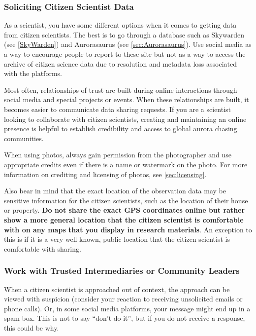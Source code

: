 \documentclass{article}
\newcommand{\contributed}[1]{%
    \par\noindent
    \begingroup
    \setlength{\leftskip}{1em}%
    \itshape
    Contributors: #1
    \par
    \endgroup
    \vspace{0.5em}
}
\begin{document}
\subsubsection{Soliciting Citizen Scientist Data}

As a scientist, you have some different options when it comes to getting data from citizen scientists. The best is to go through a database such as Skywarden (see \ref{SkyWarden}) and Aurorasaurus (see  \ref{sec:Aurorasaurus}).
Use social media as a way to encourage people to report to these site but not as a way to access the archive of citizen science data due to resolution and metadata loss associated with the platforms. 

Most often, relationships of trust are built during online interactions through social media and special projects or events.  When these relationships are built, it becomes easier to communicate data sharing requests.  If you are a scientist looking to collaborate with citizen scientists, creating and maintaining an online presence is helpful to establish credibility and access to global aurora chasing communities.

When using photos, always gain permission from the photographer and use appropriate credits even if there is a name or watermark on the photo. For more information on crediting and licensing of photos, see \ref{sec:licensing}.

Also bear in mind that the exact location of the observation data may be sensitive information for the citizen scientists, such as the location of their house or property. \textbf{Do not share the exact GPS coordinates online but rather show a more general location that the citizen scientist is comfortable with on any maps that you display in research materials}. An exception to this is if it is a very well known, public location that the citizen scientist is comfortable with sharing.

\subsubsection{Work with Trusted Intermediaries or Community Leaders}
When a citizen scientist is approached out of context, the approach can be viewed with suspicion (consider your reaction to receiving unsolicited emails or phone calls). Or, in some social media platforms, your message might end up in a spam box. This is not to say ``don't do it'', but if you do not receive a response, this could be why.
\end{document}
